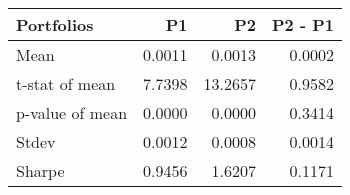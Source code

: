 \begin{tabular}{lrrr}
\toprule
Portfolios & P1 & P2 & P2 - P1 \\
\midrule
Mean & 0.0011 & 0.0013 & 0.0002 \\
t-stat of mean & 7.7398 & 13.2657 & 0.9582 \\
p-value of mean & 0.0000 & 0.0000 & 0.3414 \\
Stdev & 0.0012 & 0.0008 & 0.0014 \\
Sharpe & 0.9456 & 1.6207 & 0.1171 \\
\bottomrule
\end{tabular}
